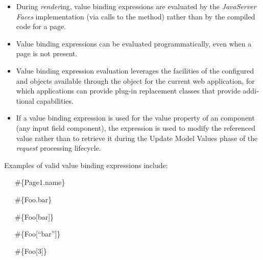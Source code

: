 \liststyleWWNumxvii
\begin{itemize}
\item \foreignlanguage{english}{During
}\foreignlanguage{english}{\textit{render}}\foreignlanguage{english}{ing,
value binding expressions are evaluated by the
}\foreignlanguage{english}{\textit{JavaServer}}\foreignlanguage{english}{
}\foreignlanguage{english}{\textit{Faces}}\foreignlanguage{english}{
implementation (via calls to the
}\foreignlanguage{english}{
method) rather than by the compiled code for a page. }
\item \foreignlanguage{english}{Value binding expressions can be
evaluated programmatically, even when a page is not present. }
\item \foreignlanguage{english}{Value binding expression evaluation
leverages the facilities of the configured
}\foreignlanguage{english}{
and
}\foreignlanguage{english}{
objects available through the
}\foreignlanguage{english}{
object for the current web application, for which applications can
provide plug-in replacement classes that provide additional
capabilities. }
\item \foreignlanguage{english}{If a value binding expression is used
for the value property of an
}\foreignlanguage{english}{
component (any input field component), the expression is used to modify
the referenced value rather than to retrieve it during the Update Model
Values phase of the
}\foreignlanguage{english}{\textit{request}}\foreignlanguage{english}{
processing lifecycle. \newline
}
\end{itemize}
\foreignlanguage{english}{Examples of valid value binding expressions
include: }

\foreignlanguage{english}{\ \ \ \#\{Page1.name\}}

\foreignlanguage{english}{\ \ \ \#\{Foo.bar\}}

\foreignlanguage{english}{\ \ \ \#\{Foo[bar]\}}

\foreignlanguage{english}{\ \ \ \#\{Foo[{\textquotedblleft}bar{\textquotedblright}]\}}

\foreignlanguage{english}{\ \ \ \#\{Foo[3]\}}

